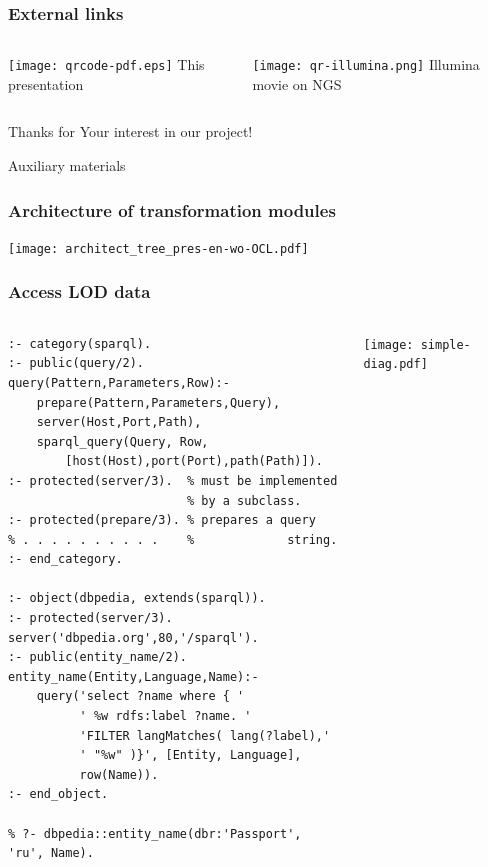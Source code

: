 \documentclass[10pt]{beamer}
\begin{document}
\begin{frame}
  \frametitle{External links}
  \begin{columns}
    \begin{column}{0.5\textwidth}\centering
      \texttt{[image: qrcode-pdf.eps]}
      This presentation
    \end{column}
    \begin{column}{0.5\textwidth}\centering
      \texttt{[image: qr-illumina.png]}
      Illumina movie on NGS
    \end{column}
  \end{columns}
\end{frame}

\begin{frame}
  \begin{center}
  \Large Thanks for Your interest in our project!
\end{center}
\end{frame}

\begin{frame}
  \begin{center}
  \Large Auxiliary materials
\end{center}
\end{frame}

\begin{frame}
  \frametitle{Architecture of transformation modules}
  \centering
  \texttt{[image: architect\_tree\_pres-en-wo-OCL.pdf]}
\end{frame}

\begin{frame}[fragile]
  \frametitle{Access LOD data}

  \begin{columns}
\begin{column}{0.5\textwidth}
\begin{verbatim}
:- category(sparql).
:- public(query/2).
query(Pattern,Parameters,Row):-
    prepare(Pattern,Parameters,Query),
    server(Host,Port,Path),
    sparql_query(Query, Row,
        [host(Host),port(Port),path(Path)]).
:- protected(server/3).  % must be implemented
                         % by a subclass.
:- protected(prepare/3). % prepares a query
% . . . . . . . . . .    %             string.
:- end_category.

:- object(dbpedia, extends(sparql)).
:- protected(server/3).
server('dbpedia.org',80,'/sparql').
:- public(entity_name/2).
entity_name(Entity,Language,Name):-
    query('select ?name where { '
          ' %w rdfs:label ?name. '
          'FILTER langMatches( lang(?label),'
          ' "%w" )}', [Entity, Language],
          row(Name)).
:- end_object.

% ?- dbpedia::entity_name(dbr:'Passport', 'ru', Name).
\end{verbatim}
\end{column}
\begin{column}{0.5\textwidth}
  \flushright
\texttt{[image: simple-diag.pdf]}
\end{column}
\end{columns}
\end{frame}
\end{document}
